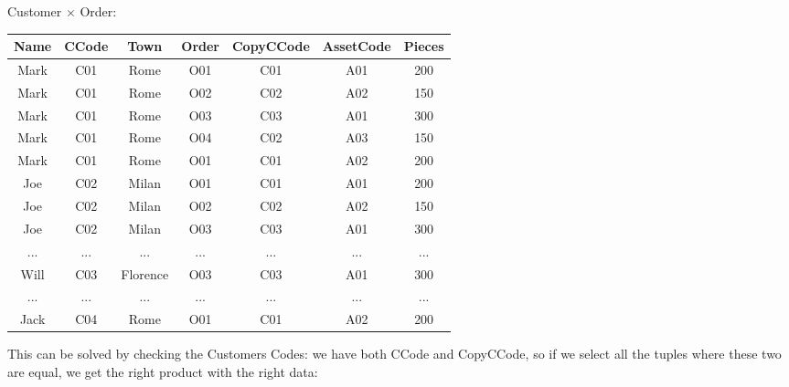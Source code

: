 \begin{center}
    Customer $\times$ Order: \\ \vspace{12pt}
    \begin{tabular}{|c|c|c|c|c|c|c|}
        \hline \rowcolor{maindoccol!60}
        \textbf{Name} & \textbf{CCode} & \textbf{Town} & \textbf{Order} & \textbf{CopyCCode} & \textbf{AssetCode} & \textbf{Pieces} \\
        \hline \rowcolor{green!10}
        Mark & C01 & Rome & O01 & C01 & A01 & 200 \\
        \hline \rowcolor{red!10}
        Mark & C01 & Rome & O02 & C02 & A02 & 150 \\
        \hline \rowcolor{red!10}
        Mark & C01 & Rome & O03 & C03 & A01 & 300 \\
        \hline \rowcolor{red!10}
        Mark & C01 & Rome & O04 & C02 & A03 & 150 \\
        \hline \rowcolor{green!10}
        Mark & C01 & Rome & O01 & C01 & A02 & 200 \\
        \hline \rowcolor{red!10}
        Joe & C02 & Milan & O01 & C01 & A01 & 200 \\
        \hline \rowcolor{green!10}
        Joe & C02 & Milan & O02 & C02 & A02 & 150 \\
        \hline \rowcolor{red!10}
        Joe & C02 & Milan & O03 & C03 & A01 & 300 \\
        \hline
        ... & ... & ... & ... & ... & ... & ... \\
        \hline \rowcolor{green!10}
        Will & C03 & Florence & O03 & C03 & A01 & 300 \\
        \hline
        ... & ... & ... & ... & ... & ... & ... \\
        \hline \rowcolor{red!10}
        Jack & C04 & Rome & O01 & C01 & A02 & 200 \\
        \hline
    \end{tabular}
\end{center}

This can be solved by checking the Customers Codes: we have both CCode and CopyCCode, so if we select all the tuples where these two are equal, we get the right product with the right data:

